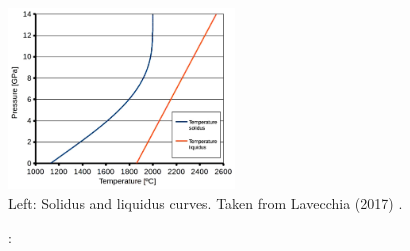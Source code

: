 \begin{center}
\includegraphics[width=6cm]{images/phasetransitions/latb17}\\
{\captionfont Left: Solidus and liquidus curves. 
Taken from Lavecchia \etal (2017) \cite{latb17}.} 
\end{center}




\Literature: \cite{scyt75}
